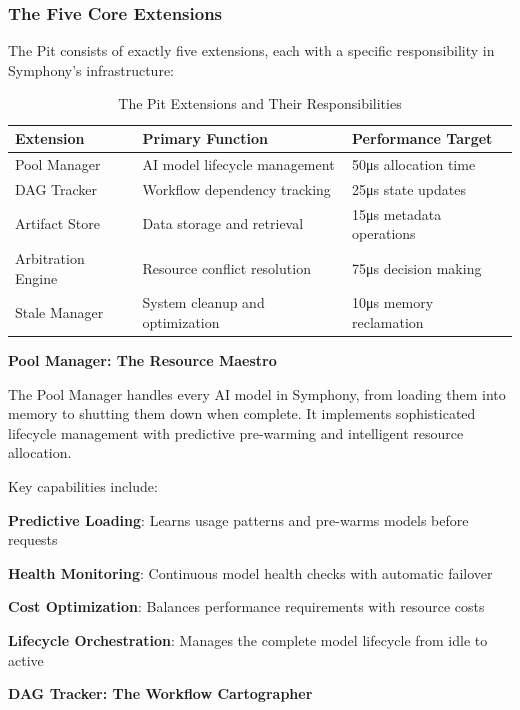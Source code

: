 \subsubsection{The Five Core Extensions}

The Pit consists of exactly five extensions, each with a specific responsibility in Symphony's infrastructure:

\begin{table}[h]
\centering
\caption{The Pit Extensions and Their Responsibilities}
\label{tab:pit-extensions}
\begin{tabular}{@{}lll@{}}
\toprule
\textbf{Extension} & \textbf{Primary Function} & \textbf{Performance Target} \\
\midrule
Pool Manager & AI model lifecycle management & 50μs allocation time \\
DAG Tracker & Workflow dependency tracking & 25μs state updates \\
Artifact Store & Data storage and retrieval & 15μs metadata operations \\
Arbitration Engine & Resource conflict resolution & 75μs decision making \\
Stale Manager & System cleanup and optimization & 10μs memory reclamation \\
\bottomrule
\end{tabular}
\end{table}

\textbf{Pool Manager: The Resource Maestro}

The Pool Manager handles every AI model in Symphony, from loading them into memory to shutting them down when complete. It implements sophisticated lifecycle management with predictive pre-warming and intelligent resource allocation.

Key capabilities include:
\begin{compactlist}
    \item \textbf{Predictive Loading}: Learns usage patterns and pre-warms models before requests
    \item \textbf{Health Monitoring}: Continuous model health checks with automatic failover
    \item \textbf{Cost Optimization}: Balances performance requirements with resource costs
    \item \textbf{Lifecycle Orchestration}: Manages the complete model lifecycle from idle to active
\end{compactlist}

\textbf{DAG Tracker: The Workflow Cartographer}

